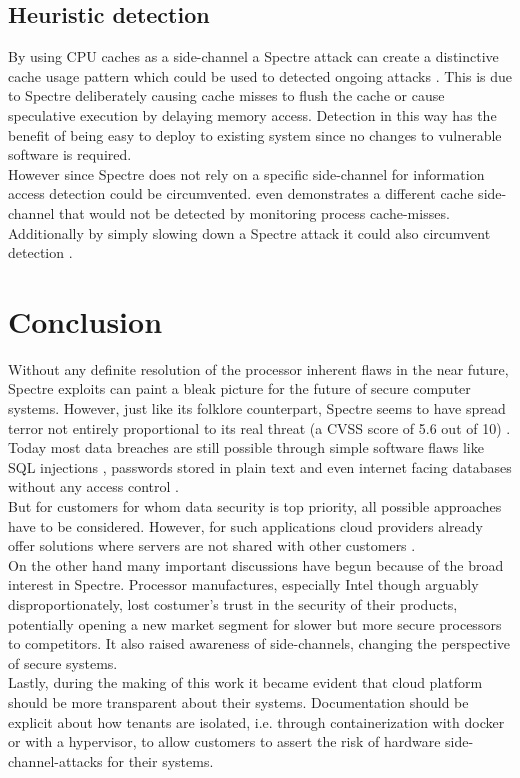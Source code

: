 \documentclass[conference,compsoc,final,a4paper]{IEEEtran}
\begin{document}
\subsection{Heuristic detection}
By using CPU caches as a side-channel a Spectre attack can create a distinctive cache usage pattern which could be used to detected ongoing attacks \cite{depoix2018}. This is due to Spectre deliberately causing cache misses to flush the cache or cause speculative execution by delaying memory access. Detection in this way has the benefit of being easy to deploy to existing system since no changes to vulnerable software is required. \cite{depoix2018, chiappetta2016real} \\
However since Spectre does not rely on a specific side-channel for information access \cite{kocher2018spectre} detection could be circumvented. \textcite{gruss2016flush+} even demonstrates a different cache side-channel that would not be detected by monitoring process cache-misses. \\
Additionally by simply slowing down a Spectre attack it could also circumvent detection \cite{chiappetta2016real}.
\section{Conclusion}
Without any definite resolution of the processor inherent flaws in the near future, Spectre exploits can paint a bleak picture for the future of secure computer systems. However, just like its folklore counterpart, Spectre seems to have spread terror not entirely proportional to its real threat (a \ac{CVSS} score of 5.6 out of 10) \cite{cveSpectre}. \\
Today most data breaches are still possible through simple software flaws like SQL injections \cite{magnetoSQLi}, passwords stored in plain text \cite{facebookPlainText} and even internet facing databases without any access control \cite{unistellarMongoDB}. \\
But for customers for whom data security is top priority, all possible approaches have to be considered. However, for such applications cloud providers already offer solutions where servers are not shared with other customers \cite{AWSDedicated}. \\
On the other hand many important discussions have begun because of the broad interest in Spectre. Processor manufactures, especially Intel though arguably disproportionately, lost costumer's trust in the security of their products, potentially opening a new market segment for slower but more secure processors to competitors. It also raised awareness of side-channels, changing the perspective of secure systems. \\
Lastly, during the making of this work it became evident that cloud platform should be more transparent about their systems. Documentation should be explicit about how tenants are isolated, i.e. through containerization with docker or with a hypervisor, to allow customers to assert the risk of hardware side-channel-attacks for their systems.
\end{document}
